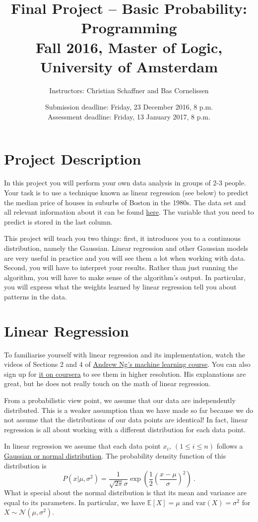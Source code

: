 \documentclass[11pt, leqno, a4paper]{article}
\title{Final Project -- Basic Probability: Programming\\[2mm]
\large{Fall 2016, Master of Logic, University of Amsterdam}}
\author{Instructors: Christian Schaffner and Bas Cornelissen}
\date{Submission deadline: Friday, 23 December 2016, 8 p.m.\\
Assessment deadline: Friday, 13 January 2017, 8 p.m.}
\begin{document}
\maketitle

\section{Project Description}

In this project you will perform your own data analysis in groups of 2-3 people. Your task is
to use a technique known as linear regression (see below) to predict the median price of houses
in suburbs of Boston in the 1980s. The data set and all relevant information about it can be found
\href{https://archive.ics.uci.edu/ml/datasets/Housing}{here}. The variable that you need
to predict is stored in the last column.

This project will teach you two things: first, it introduces you to a continuous distribution, namely
the Gaussian. Linear regression and other Gaussian models are very useful in practice and you will
see them a lot when working with data. Second, you will have to interpret your results. Rather than
just running the algorithm, you will have to make sense of the algorithm's output. In particular, you
will express what the weights learned by linear regression tell you about patterns in the data.

\section{Linear Regression}
To familiarise yourself with linear regression and its implementation, watch the
videos of Sections 2 and 4 of \href{https://www.youtube.com/watch?v=ylWBbxQHwFM&list=PLLH73N9cB21V_O2JqILVX557BST2cqJw4}{Andrew Ng's machine
learning course}. You can also sign up for \href{https://www.coursera.org/learn/machine-learning/home}{it on coursera} to see them
in higher resolution. His explanations are great, but he does not really touch on the math of linear regression.

From a probabilistic view point, we assume that our data are independently distributed. This is a weaker
assumption than we have made so far because we do not assume that the distributions of our data points
are identical! In fact, linear regression is all about working with a different distribution for each
data point. 

In linear regression we assume that each data point $ x_{i},\ (1 \leq i \leq n) $ follows a 
\href{https://en.wikipedia.org/wiki/Normal_distribution}{Gaussian or normal distribution}. The probability
density function of this distribution is
\begin{equation}
P(x|\mu, \sigma^{2}) = \frac{1}{\sqrt{2\pi}\sigma}\exp\left(\frac{1}{2}\left(\frac{x - \mu}{\sigma}\right)^{2}\right) \ .
\end{equation}
What is special about the normal distribution is that its mean and variance are equal to its parameters.
In particular, we have $ \mathbb{E}[X] = \mu $ and $ \text{var}(X) = \sigma^{2} $ for 
$ X \sim \mathcal{N}(\mu, \sigma^{2}) $.
\end{document}
